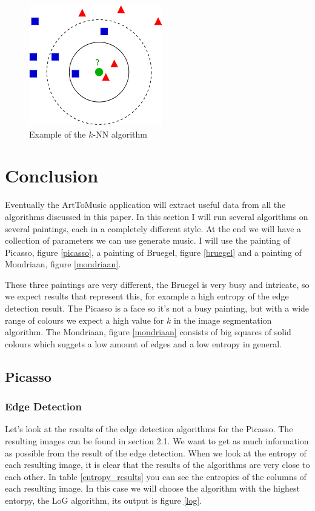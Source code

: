 \documentclass[12pt]{article}
\begin{document}
\begin{figure}[H]
\centering
\includegraphics[scale = 0.6]{img/kNN}
\caption{Example of the $k$-NN algorithm}
\label{kNN}
\end{figure} 

\section{Conclusion}

Eventually the ArtToMusic application will extract useful data from all the algorithms discussed in this paper. In this section I will run several algorithms on several paintings, each in a completely different style. At the end we will have a collection of parameters we can use generate music. I will use the painting of Picasso, figure \ref{picasso}, a painting of Bruegel, figure \ref{bruegel} and a painting of Mondriaan, figure \ref{mondriaan}.
\newline

These three paintings are very different, the Bruegel is very busy and intricate, so we expect results that represent this, for example a high entropy of the edge detection result. The Picasso is a face so it's not a busy painting, but with a wide range of colours we expect a high value for $k$ in the image segmentation algorithm. The Mondriaan, figure \ref{mondriaan} consists of big squares of solid colours which suggets a low amount of edges and a low entropy in general.

\subsection{Picasso}

\subsubsection{Edge Detection}

Let's look at the results of the edge detection algorithms for the Picasso. The resulting images can be found in section 2.1. We want to get as much information as possible from the result of the edge detection. When we look at the entropy of each resulting image, it is clear that the results of the algorithms are very close to each other. In table \ref{entropy_results} you can see the entropies of the columns of each resulting image. In this case we will choose the algorithm with the highest entorpy, the LoG algorithm, its output is figure \ref{log}.
\newline
\end{document}
